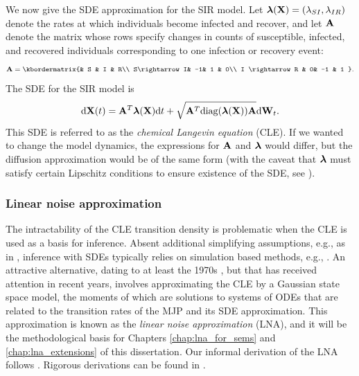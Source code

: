 We now give the SDE approximation for the SIR model. Let $ \boldsymbol{\lambda}(\mathbf{X}) = (\lambda_{SI}, \lambda_{IR}) $ denote the rates at which individuals become infected and recover, and let $ \mathbf{A} $ denote the matrix whose rows specify changes in counts of susceptible, infected, and recovered individuals corresponding to one infection or recovery event:
\begin{equation*}
\bA = \kbordermatrix{& S & I &  R\\
	S\rightarrow I& -1& 1 & 0\\
	I \rightarrow R & 0& -1 & 1
}.
\end{equation*}
The SDE for the SIR model is 
\begin{equation}
\label{eqn:sir_sde}
\mathrm{d}\mathbf{X}(t) = \mathbf{A}^T\boldsymbol{\lambda}(\mathbf{X})\mathrm{d} t + \sqrt{\mathbf{A}^T\mathrm{diag}(\boldsymbol{\lambda}(\mathbf{X}))\mathbf{A}}\mathrm{d}\mathbf{W}_t.
\end{equation}
This SDE is referred to as the \textit{chemical Langevin equation} (CLE). If we wanted to change the model dynamics, the expressions for $ \mathbf{A} $ and $ \boldsymbol{\lambda} $ would differ, but the diffusion approximation would be of the same form (with the caveat that $ \boldsymbol{\lambda} $ must satisfy certain Lipschitz conditions to ensure existence of the SDE, see \cite{fuchs2013inference,oksendal2003stochastic}). 

\subsubsection{Linear noise approximation}
\label{subsubsec:lna_background}

The intractability of the CLE transition density is problematic when the CLE is used as a basis for inference. Absent additional simplifying assumptions, e.g., as in \cite{cauchemez2008}, inference with SDEs typically relies on simulation based methods, e.g., \cite{dukic2012,golightly2013simulation,golightly2018efficient}. An attractive alternative, dating to at least the 1970s \cite{kurtz1970solutions,kurtz1971limit}, but that has received attention in recent years, involves approximating the CLE by a Gaussian state space model, the moments of which are solutions to systems of ODEs that are related to the transition rates of the MJP and its SDE approximation. This approximation is known as the \textit{linear noise approximation} (LNA), and it will be the methodological basis for Chapters \ref{chap:lna_for_sems} and \ref{chap:lna_extensions} of this dissertation. Our informal derivation of the LNA follows \cite{golightly2013simulation,wilkinson2011stochastic}. Rigorous derivations can be found in \cite{elf2003fast,kurtz1981approximation,vankampen2007stochastic,wallace2012linear}. 

